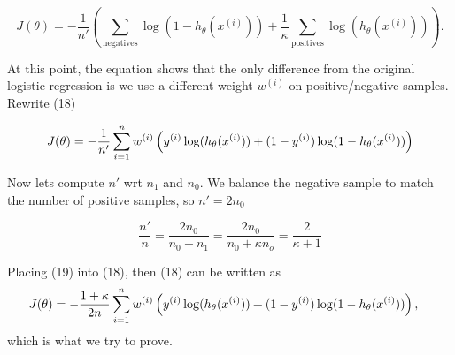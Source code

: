 \begin{answer}
\begin{equation}
    J(\theta) = -\frac{1}{n'} \left( \sum_{\text{negatives}} \log(1 - h_{\theta}(x^{(i)})) + \frac{1}{\kappa} \sum_{\text{positives}} \log(h_{\theta}(x^{(i)})) \right).
\end{equation}

At this point, the equation shows that the only difference from the original logistic regression is we use a different weight $w^{(i)}$ on positive/negative samples. Rewrite (18)

\begin{equation}
    J(\theta) = -\frac{1}{n'} \sum_{i=1}^{n} w^{(i)} \left(y^{(i)}\log(h_{\theta}(x^{(i)}))
+  (1 - y^{(i)})\log(1 - h_{\theta}(x^{(i)}))\right)
\end{equation}

Now lets compute $n'$ wrt $n_1$ and $n_0$. We balance the negative sample to match the number of positive samples, so $n' = 2 n_0$

\begin{equation}
    \frac{n'}{n} = \frac{2 n_0}{n_0 + n_1} = \frac{2 n_0}{n_0 + \kappa n_o} = \frac{2}{\kappa + 1}
\end{equation}

Placing (19) into (18), then (18) can be written as 
\begin{align*}
J(\theta) &= -\frac{1+\kappa}{2n} \sum_{i=1}^{n} w^{(i)} \left(y^{(i)}\log(h_{\theta}(x^{(i)}))
+  (1 - y^{(i)})\log(1 - h_{\theta}(x^{(i)}))\right),
\end{align*}
which is what we try to prove.
\end{answer}


